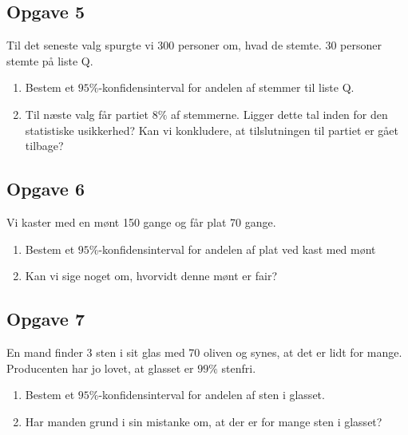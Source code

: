 \subsection*{Opgave 5}

Til det seneste valg spurgte vi 300 personer om, hvad de stemte. 30 personer stemte på liste Q. 
\begin{enumerate}[label=\roman*)]
	\item Bestem et $95\%$-konfidensinterval for andelen af stemmer til liste Q.
	\item Til næste valg får partiet $8\%$ af stemmerne. Ligger dette tal inden for den statistiske usikkerhed? Kan vi konkludere, at tilslutningen til partiet er gået tilbage?
\end{enumerate}


\subsection*{Opgave 6}
Vi kaster med en mønt 150 gange og får plat 70 gange. 
\begin{enumerate}[label=\roman*)]
	\item Bestem et $95\%$-konfidensinterval for andelen af plat ved kast med mønt
	\item Kan vi sige noget om, hvorvidt denne mønt er fair?
\end{enumerate}

\subsection*{Opgave 7}
En mand finder 3 sten i sit glas med 70 oliven og synes, at det er lidt for mange. Producenten har jo lovet, at glasset er $99\%$ stenfri. 
\begin{enumerate}[label=\roman*)]
	\item Bestem et $95\%$-konfidensinterval for andelen af sten i glasset.
	\item Har manden grund i sin mistanke om, at der er for mange sten i glasset?
\end{enumerate}


